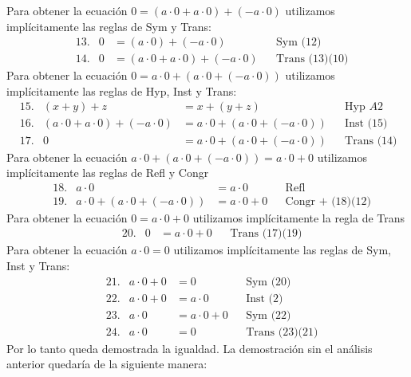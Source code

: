 \documentclass[a4paper]{article}
\begin{document}
Para obtener la ecuación \(0 = (a \cdot 0 + a \cdot 0) + (-a \cdot 0)\)
utilizamos implícitamente las reglas de Sym y Trans:
\begin{align*}
    &\text{13.} & 0 &= (a \cdot 0) + (-a \cdot 0) & &\text{Sym (12)} \\
    &\text{14.} & 0 &= (a \cdot 0 + a \cdot 0) + (-a \cdot 0)  & &\text{Trans (13)(10)}
\end{align*}
Para obtener la ecuación \(0 = a \cdot 0 + (a \cdot 0 + (-a \cdot 0))\)
utilizamos implícitamente las reglas de Hyp, Inst y Trans:
\begin{align*}
    &\text{15.} & (x + y) + z &= x + (y + z) & &\text{Hyp } A2 \\
    &\text{16.} &  (a \cdot 0 + a \cdot 0) + (-a \cdot 0) &= a \cdot 0 + (a \cdot 0 + (-a \cdot 0))  & &\text{Inst (15)} \\
    &\text{17.} &  0 &= a \cdot 0 + (a \cdot 0 + (-a \cdot 0))  & &\text{Trans (14)(16)}
\end{align*}
Para obtener la ecuación \(a \cdot 0 + (a \cdot 0 + (-a \cdot 0)) = a \cdot 0 + 0\)
utilizamos implícitamente las reglas de Refl y Congr
\begin{align*}
    &\text{18.} & a \cdot 0 &= a \cdot 0 & &\text{Refl} \\
    &\text{19.} & a \cdot 0 + (a \cdot 0 + (-a \cdot 0)) &= a \cdot 0 + 0  & &\text{Congr + (18)(12)}
\end{align*}
Para obtener la ecuación \(0 = a \cdot 0 + 0\) utilizamos implícitamente la regla de Trans
\begin{align*}
    &\text{20.} & 0 &= a \cdot 0 + 0 & &\text{Trans (17)(19)}
\end{align*}
Para obtener la ecuación \(a \cdot 0 = 0\) utilizamos implícitamente las reglas de 
Sym, Inst y Trans:
\begin{align*}
    &\text{21.} & a \cdot 0 + 0 &= 0 & &\text{Sym (20)} \\
    &\text{22.} & a \cdot 0 + 0 &= a \cdot 0 & &\text{Inst (2)} \\
    &\text{23.} & a \cdot 0 &= a \cdot 0 + 0 & &\text{Sym (22)} \\
    &\text{24.} & a \cdot 0 &= 0 & &\text{Trans (23)(21)}
\end{align*}
Por lo tanto queda demostrada la igualdad.
\newline 
La demostración sin el análisis anterior quedaría de la siguiente manera:
\end{document}
